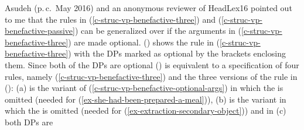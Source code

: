 Asudeh (p.\,c.\ May 2016) and an anonymous reviewer of Head\-Lex16 pointed out to me that the rules in
(\ref{c-struc-vp-benefactive-three}) and (\ref{c-struc-vp-benefactive-passive}) can be generalized over if
the arguments in (\ref{c-struc-vp-benefactive-three}) are made optional. () shows the rule in
(\ref{c-struc-vp-benefactive-three}) with the DPs marked as optional by the brackets enclosing them.
\ea\label{c-struc-vp-benefactive-optional-args}
\z
Since both of the DPs are optional () is equivalent to a specification of four rules, namely
(\ref{c-struc-vp-benefactive-three}) and the three versions of the rule in ():
\eal
\ex\label{c-struc-vp-benefactive-optional-args-otheta}
\ex\label{c-struc-vp-benefactive-optional-args-obj}
\ex\label{c-struc-vp-benefactive-optional-args-none}
\zl
(a) is the variant of (\ref{c-struc-vp-benefactive-optional-args}) in which the \obj is
omitted (needed for (\ref{ex-she-had-been-prepared-a-meal})), (b) is the variant in which the
\objtheta is omitted (needed for (\ref{ex-extraction-secondary-object})) and in (c) both DPs are
